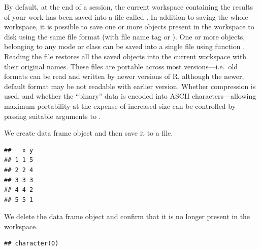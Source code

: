 \documentclass[krantz2]{krantz}\usepackage{knitr}%
\begin{document}
By default, at the end of a session, the current workspace containing the results of your work has been saved into a file called . In addition to saving the whole workspace, it is possible to save one or more \Rlang objects present in the workspace to disk using the same file format (with file name tag  or ). One or more objects, belonging to any mode or class can be saved into a single file using function . Reading the file restores all the saved objects into the current workspace with their original names. These files are portable across most \Rlang versions---i.e.\ old formats can be read and written by newer versions of R, although the newer, default format may be not readable with earlier version. Whether compression is used, and whether the ``binary'' data is encoded into ASCII characters---allowing maximum portability at the expense of increased size can be controlled by passing suitable arguments to .

We create data frame object and then save it to a file.

\begin{knitrout}\footnotesize
{}\color{fgcolor}\begin{kframe}
\begin{alltt}
 \hlkwb{<-} \hlstd{(} \hlstd{=} \hlopt{:}\hlstd{,}  \hlstd{=} \hlopt{:}\hlstd{)}
\end{alltt}
\begin{verbatim}
##   x y
## 1 1 5
## 2 2 4
## 3 3 3
## 4 4 2
## 5 5 1
\end{verbatim}
\begin{alltt}
  \hlstd{=} \hlstd{)}
\end{alltt}
\end{kframe}
\end{knitrout}

We delete the data frame object and confirm that it is no longer present in the workspace.

\begin{knitrout}\footnotesize
{}\color{fgcolor}\begin{kframe}
\begin{alltt}
\hlstd{(} \hlstd{=} \hlstd{)}
\end{alltt}
\begin{verbatim}
## character(0)
\end{verbatim}
\end{kframe}
\end{knitrout}
\end{document}
